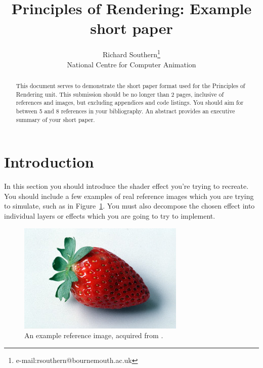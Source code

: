 \documentclass[]{acmsiggraph}
\title{Principles of Rendering: Example short paper}
\author{Richard Southern\thanks{e-mail:rsouthern@bournemouth.ac.uk}\\National Centre for Computer Animation}
\begin{document}

\maketitle


\begin{abstract}
This document serves to demonstrate the short paper format used for the Principles of Rendering unit. This submission should be no longer than 2 pages, inclusive of references and images, but excluding appendices and code listings. You should aim for between 5 and 8 references in your bibliography.
An abstract provides an executive summary of your short paper.
\end{abstract}

\section{Introduction} \label{sec:introduction}
In this section you should introduce the shader effect you're trying to recreate. You should include a few examples of real reference images which you are trying to simulate, such as in Figure~\ref{fig:reference}. You must also decompose the chosen effect into individual layers or effects which you are going to try to implement. 

\begin{figure}[htbp]\centering
 \includegraphics[width=0.75\linewidth]{images/strawberry.jpg}
 \caption{\label{fig:reference}An example reference image, acquired from \protect\cite{fruits16}.}
\end{figure}
\end{document}
